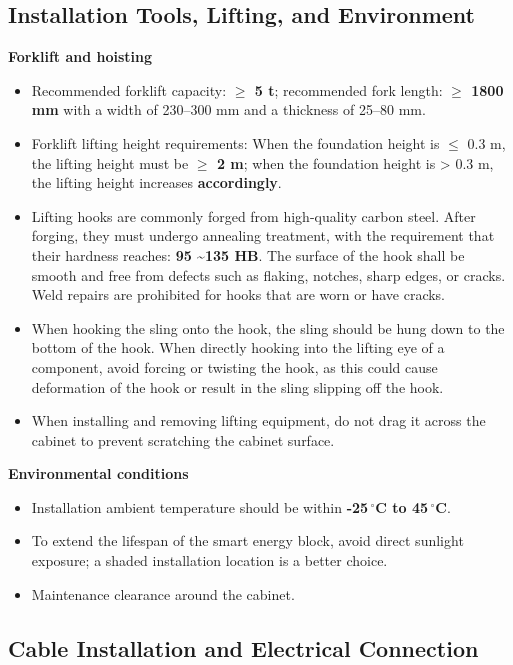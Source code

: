 \documentclass[11pt, a4paper]{article}
\begin{document}
\subsection{Installation Tools, Lifting, and Environment}
\textbf{Forklift and hoisting}
\begin{itemize}[leftmargin=1.5em]
    \item Recommended forklift capacity: \textbf{$\geq$ 5 t}; recommended fork length: \textbf{$\geq$ 1800 mm} with a width of 230–300 mm and a thickness of 25–80 mm.
    \item Forklift lifting height requirements: When the foundation height is {$\leq$ 0.3 m}, the lifting height must be \textbf{$\geq$ 2 m}; when the foundation height is > 0.3 m, the lifting height increases \textbf{accordingly}.
    \item Lifting hooks are commonly forged from high-quality carbon steel. After forging, they must undergo annealing treatment, with the requirement that their hardness reaches: \textbf{95 \textasciitilde 135 HB}. The surface of the hook shall be smooth and free from defects such as flaking, notches, sharp edges, or cracks. Weld repairs are prohibited for hooks that are worn or have cracks.
    \item When hooking the sling onto the hook, the sling should be hung down to the bottom of the hook. When directly hooking into the lifting eye of a component, avoid forcing or twisting the hook, as this could cause deformation of the hook or result in the sling slipping off the hook. 
    \item When installing and removing lifting equipment, do not drag it across the cabinet to prevent scratching the cabinet surface.
\end{itemize}

\textbf{Environmental conditions}
\begin{itemize}[leftmargin=1.5em]
    \item Installation ambient temperature should be within \textbf{-25\,$^{\circ}$C to 45\,$^{\circ}$C}.
    \item To extend the lifespan of the smart energy block, avoid direct sunlight exposure; a shaded installation location is a better choice.
    \item Maintenance clearance around the cabinet.
\end{itemize}

\subsection{Cable Installation and Electrical Connection}
\end{document}
